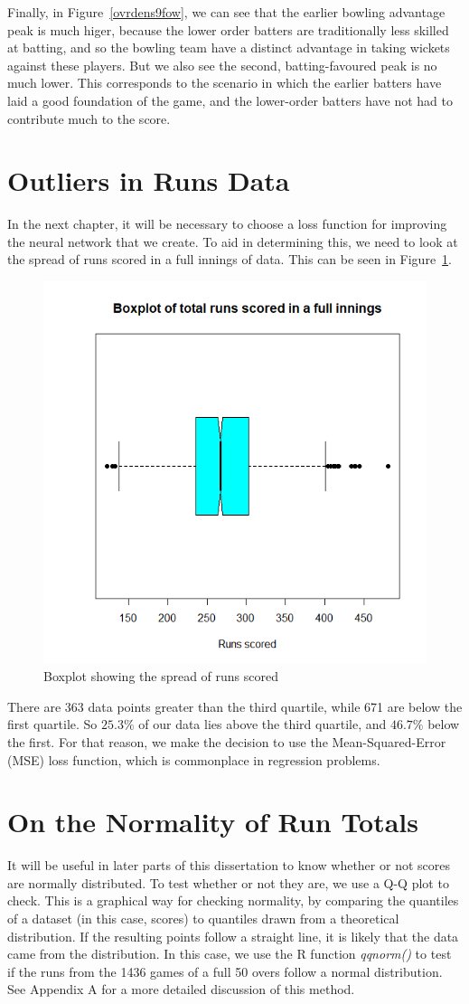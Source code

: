 Finally, in Figure~\ref{ovrdens9fow}, we can see that the earlier bowling advantage peak is much higer, because the lower order batters are traditionally less skilled 
at batting, and so the bowling team have a distinct advantage in taking wickets against these players. But we also see the second, batting-favoured peak is no much lower.
This corresponds to the scenario in which the earlier batters have laid a good foundation of the game, and the lower-order batters have not had to contribute much to the score.

\section{Outliers in Runs Data}
\label{mse}
In the next chapter, it will be necessary to choose a loss function for improving the neural network that we create. To aid in determining this, we need to look at the
spread of runs scored in a full innings of data. This can be seen in Figure~\ref{runsbox}.

\begin{figure}[h]
    \centering
    \includegraphics[width=0.4\linewidth]{figures/runsbox.png}
    \caption{Boxplot showing the spread of runs scored}
    \label{runsbox}
\end{figure}

There are 363 data points greater than the third quartile, while 671 are below the first quartile. So $25.3\%$ of our data lies above the third quartile, and
$46.7\%$ below the first. For that reason, we make the decision to use the Mean-Squared-Error (MSE) loss function, which is commonplace in regression problems.

\section{On the Normality of Run Totals}
It will be useful in later parts of this dissertation to know whether or not scores are normally distributed. To test whether or not 
they are, we use a Q-Q plot to check. This is a graphical way for checking normality, by comparing the quantiles of a dataset (in this case, scores) to quantiles
drawn from a theoretical distribution. If the resulting points follow a straight line, it is likely that the data came from the distribution.
In this case, we use the R function \textit{qqnorm()} to test if the runs from the 1436 games of a full 50 overs follow a normal distribution. See Appendix A for 
a more detailed discussion of this method.

